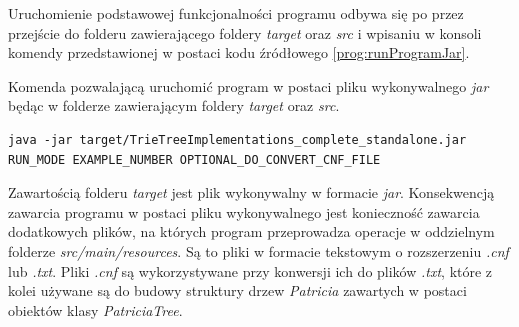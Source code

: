     	Uruchomienie podstawowej funkcjonalności programu odbywa się po przez przejście do folderu zawierającego foldery \emph{target} oraz \emph{src} i wpisaniu w konsoli komendy przedstawionej w postaci kodu źródłowego \ref{prog:runProgramJar}.
    	
    	\begin{program}
			\caption{Komenda pozwalającą uruchomić program w postaci pliku wykonywalnego \emph{jar} będąc w folderze zawierającym foldery \emph{target} oraz \emph{src}.}\label{prog:runProgramJar}
			\begin{lstlisting}[basicstyle=\small,]
java -jar target/TrieTreeImplementations_complete_standalone.jar RUN_MODE EXAMPLE_NUMBER OPTIONAL_DO_CONVERT_CNF_FILE
    	    \end{lstlisting}
	    \end{program}
    	
    	Zawartością folderu \emph{target} jest plik wykonywalny w formacie \emph{jar}. Konsekwencją zawarcia programu w postaci pliku wykonywalnego jest konieczność zawarcia dodatkowych plików, na których program przeprowadza operacje w oddzielnym folderze \emph{src/main/resources}. Są to pliki w formacie tekstowym o rozszerzeniu \emph{.cnf} lub \emph{.txt}. Pliki \emph{.cnf} są wykorzystywane przy konwersji ich do plików \emph{.txt}, które z kolei używane są do budowy struktury drzew \emph{Patricia} zawartych w postaci obiektów klasy \emph{PatriciaTree}.
    	
